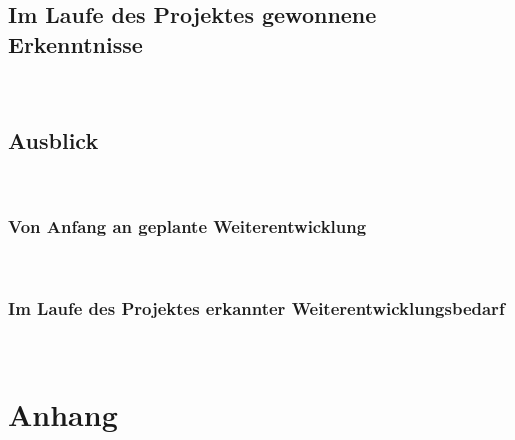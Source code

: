 \documentclass[11pt,toc=sectionentrywithoutdots, 
headheight=44pt, headings=optiontoheadandtoc, hyperfootnotes=false, hypertexnames=false]{scrartcl}
\begin{document}
\subsection{Im Laufe des Projektes gewonnene Erkenntnisse}
\blindtext\

\subsection{Ausblick}
\blindtext\

\subsubsection{Von Anfang an geplante Weiterentwicklung}
\blindtext\

\subsubsection{Im Laufe des Projektes erkannter Weiterentwicklungsbedarf}
\blindtext\


\newpage
\setcounter{secnumdepth}{0}

{}

\printbibliography




\newpage


\setcounter{page}{1}
\setcounter{secnumdepth}{2}


\renewcommand{\thesection}{A}
\setcounter{section}{1}



\ofoot{\thepage}




\FloatBarrier
\section{Anhang}
\end{document}
